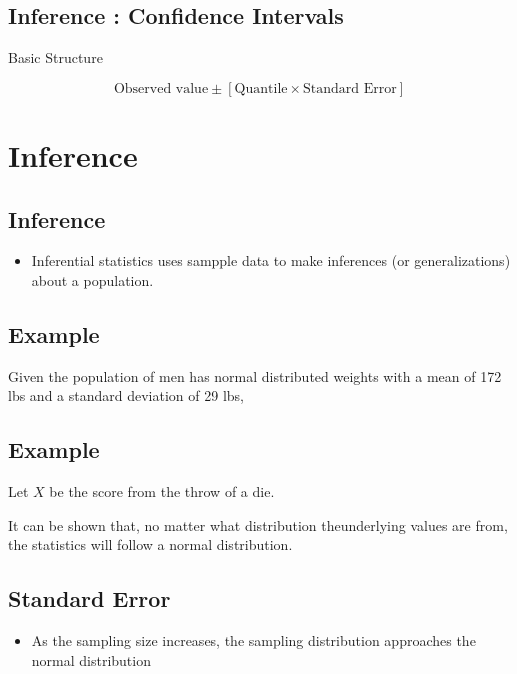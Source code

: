 \documentclass[]{report}
\begin{document}
{{{
\subsection{Inference : Confidence Intervals }

Basic Structure

\[ \mbox{Observed value} \pm [\mbox{Quantile}\times \mbox{Standard Error}] \] 



}





\section{Inference}
{
\subsection{Inference}
\begin{itemize}
\item Inferential statistics uses sampple data to make inferences (or generalizations) about a population.
\end{itemize}
}


{
\subsection{Example}
Given the population of men has normal distributed weights with a mean of 172 lbs and a standard deviation of 29 lbs,



\subsection{Example}
Let $X$ be the score from the throw of a die.

It can be shown that, no matter what distribution theunderlying values are from, the statistics will follow a normal distribution.


\subsection{Standard Error}

\begin{itemize}

\item As the sampling size increases, the sampling distribution approaches the normal distribution



\end{itemize}}}}
\end{document}
